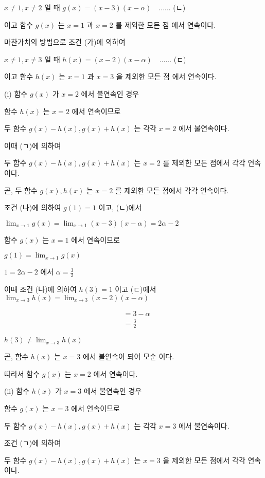 \documentclass[10pt]{article}
\begin{document}
$x \neq 1, x \neq 2$ 일 때 $g(x)=(x-3)(x-\alpha) \quad$...... (ㄴ)

이고 함수 $g(x)$ 는 $x=1$ 과 $x=2$ 를 제외한 모든 점 에서 연속이다.

마찬가치의 방법으로 조건 (가)에 의하여

$x \neq 1, x \neq 3$ 일 때 $h(x)=(x-2)(x-\alpha) \quad$...... (ㄷ)

이고 함수 $h(x)$ 는 $x=1$ 과 $x=3$ 을 제외한 모든 점 에서 연속이다.

(i) 함수 $g(x)$ 가 $x=2$ 에서 불연속인 경우

함수 $h(x)$ 는 $x=2$ 에서 연속이므로

두 함수 $g(x)-h(x), g(x)+h(x)$ 는 각각 $x=2$ 에서 불연속이다.

이때 (ㄱ)에 의하여

두 함수 $g(x)-h(x), g(x)+h(x)$ 는 $x=2$ 를 제외한 모든 점에서 각각 연속이다.

곧, 두 함수 $g(x), h(x)$ 는 $x=2$ 를 제외한 모든 점에서 각각 연속이다.

조건 (나)에 의하여 $g(1)=1$ 이고, (ㄴ)에서

$\lim _{x \rightarrow 1} g(x)=\lim _{x \rightarrow 1}(x-3)(x-\alpha)=2 \alpha-2$

함수 $g(x)$ 는 $x=1$ 에서 연속이므로

$g(1)=\lim _{x \rightarrow 1} g(x)$

$1=2 \alpha-2$ 에서 $\alpha=\frac{3}{2}$

이때 조건 (나)에 의하여 $h(3)=1$ 이고 (ㄷ)에서 $\lim _{x \rightarrow 3} h(x)=\lim _{x \rightarrow 3}(x-2)(x-\alpha)$

\[
\begin{aligned}
& =3-\alpha \\
& =\frac{3}{2}
\end{aligned}
\]

$h(3) \neq \lim _{x \rightarrow 3} h(x)$

곧, 함수 $h(x)$ 는 $x=3$ 에서 불연속이 되어 모순 이다.

따라서 함수 $g(x)$ 는 $x=2$ 에서 연속이다.

(ii) 함수 $h(x)$ 가 $x=3$ 에서 불연속인 경우

함수 $g(x)$ 는 $x=3$ 에서 연속이므로

두 함수 $g(x)-h(x), g(x)+h(x)$ 는 각각 $x=3$ 에서 불연속이다.

조건 (ㄱ)에 의하여

두 함수 $g(x)-h(x), g(x)+h(x)$ 는 $x=3$ 을 제외한 모든 점에서 각각 연속이다.
\end{document}
